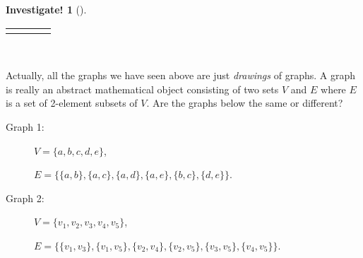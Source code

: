 \documentclass[12pt,]{book}
\theoremstyle{plain}
\theoremstyle{definition}
\theoremstyle{definition}
\theoremstyle{definition}
\newtheorem{investigation}[project]{Investigate!}
\numberwithin{equation}{chapter}
\newlength{\panelmax}
\newcommand{\vtx}[2]{node[fill,circle,inner sep=0pt, minimum size=4pt,label=#1:#2]{}}
\renewcommand{\v}{\vtx{above}{}}
\begin{document}
\begin{investigation}[]
{\begin{lrbox}{\panelboxDimage}
{{
}
}\end{lrbox}
\ifdefined\phDimage\else\newlength{\phDimage}\fi%
\setlength{\phDimage}{\ht\panelboxDimage+\dp\panelboxDimage}
\settototalheight{\phDimage}{\usebox{\panelboxDimage}}
\setlength{\panelmax}{\maxof{\panelmax}{\phDimage}}
\leavevmode%
\setlength{\tabcolsep}{0.035\linewidth}
\par\medskip\noindent
\hspace*{0.035\linewidth}%
\begin{tabular}{@{}*{4}{c}@{}}
\begin{minipage}[c][\panelmax][b]{0.18\linewidth}\usebox{\panelboxAimage}\end{minipage}&
\begin{minipage}[c][\panelmax][b]{0.18\linewidth}\usebox{\panelboxBimage}\end{minipage}&
\begin{minipage}[c][\panelmax][b]{0.18\linewidth}\usebox{\panelboxCimage}\end{minipage}&
\begin{minipage}[c][\panelmax][b]{0.18\linewidth}\usebox{\panelboxDimage}\end{minipage}\end{tabular}\\
}%
\par
\hypertarget{p-1503}{}%
Actually, all the graphs we have seen above are just \emph{drawings} of graphs. A graph is really an abstract mathematical object consisting of two sets \(V\) and \(E\) where \(E\) is a set of 2-element subsets of \(V\). Are the graphs below the same or different? %
\begin{description}
\item[{Graph 1:}]\hypertarget{li-695}{}\hypertarget{p-1504}{}%
\(V = \{a, b, c, d, e\}\),%
\par
\hypertarget{p-1505}{}%
\(E = \{\{a,b\}, \{a, c\}, \{a,d\}, \{a,e\}, \{b,c\}, \{d,e\}\}\).%
\item[{Graph 2:}]\hypertarget{li-696}{}\hypertarget{p-1506}{}%
\(V = \{v_1, v_2, v_3, v_4, v_5\}\),%
\par
\hypertarget{p-1507}{}%
\(E = \{\{v_1, v_3\}, \{v_1, v_5\}, \{v_2, v_4\}, \{v_2, v_5\}, \{v_3, v_5\}, \{v_4, v_5\}\}\).%
\end{description}
%
\end{investigation}
\end{document}
